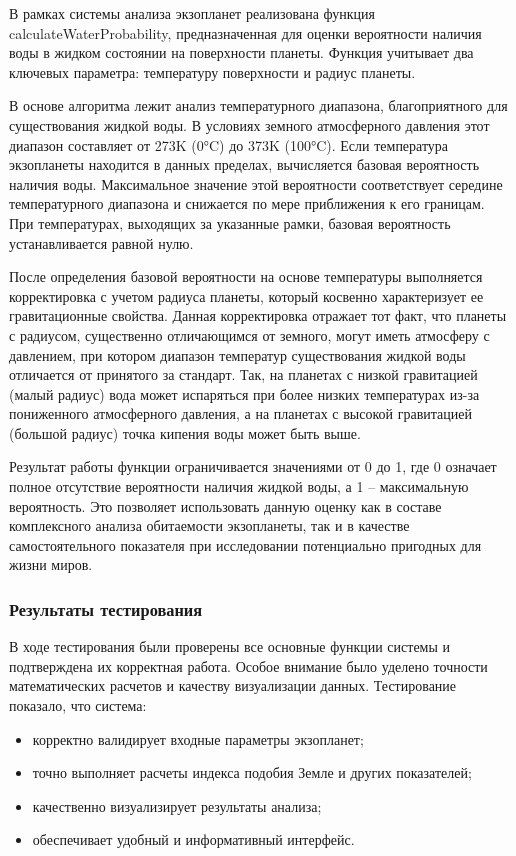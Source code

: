 В рамках системы анализа экзопланет реализована функция calculateWaterProbability, предназначенная для оценки вероятности наличия воды в жидком состоянии на поверхности планеты. Функция учитывает два ключевых параметра: температуру поверхности и радиус планеты.

В основе алгоритма лежит анализ температурного диапазона, благоприятного для существования жидкой воды. В условиях земного атмосферного давления этот диапазон составляет от 273K (0°C) до 373K (100°C). Если температура экзопланеты находится в данных пределах, вычисляется базовая вероятность наличия воды. Максимальное значение этой вероятности соответствует середине температурного диапазона и снижается по мере приближения к его границам. При температурах, выходящих за указанные рамки, базовая вероятность устанавливается равной нулю.

После определения базовой вероятности на основе температуры выполняется корректировка с учетом радиуса планеты, который косвенно характеризует ее гравитационные свойства. Данная корректировка отражает тот факт, что планеты с радиусом, существенно отличающимся от земного, могут иметь атмосферу с давлением, при котором диапазон температур существования жидкой воды отличается от принятого за стандарт. Так, на планетах с низкой гравитацией (малый радиус) вода может испаряться при более низких температурах из-за пониженного атмосферного давления, а на планетах с высокой гравитацией (большой радиус) точка кипения воды может быть выше.

Результат работы функции ограничивается значениями от 0 до 1, где 0 означает полное отсутствие вероятности наличия жидкой воды, а 1 – максимальную вероятность. Это позволяет использовать данную оценку как в составе комплексного анализа обитаемости экзопланеты, так и в качестве самостоятельного показателя при исследовании потенциально пригодных для жизни миров.

\subsubsection{Результаты тестирования}

В ходе тестирования были проверены все основные функции системы и подтверждена их корректная работа. Особое внимание было уделено точности математических расчетов и качеству визуализации данных. Тестирование показало, что система:

\begin{itemize}
    \item корректно валидирует входные параметры экзопланет;
    \item точно выполняет расчеты индекса подобия Земле и других показателей;
    \item качественно визуализирует результаты анализа;
    \item обеспечивает удобный и информативный интерфейс.
\end{itemize}

